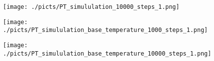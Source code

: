 \begin{frame}[plain]

	\begin{center}
		\begin{figure}\texttt{[image: ./picts/PT\_simululation\_10000\_steps\_1.png]}\end{figure}	
	\end{center}	
		
\end{frame}

\begin{frame}[plain]

	\begin{center}
		\begin{figure}\texttt{[image: ./picts/PT\_simululation\_base\_temperature\_1000\_steps\_1.png]}\end{figure}	
	\end{center}	
		
\end{frame}

\begin{frame}[plain]

	\begin{center}
		\begin{figure}\texttt{[image: ./picts/PT\_simululation\_base\_temperature\_10000\_steps\_1.png]}\end{figure}	
	\end{center}	
		
\end{frame}
